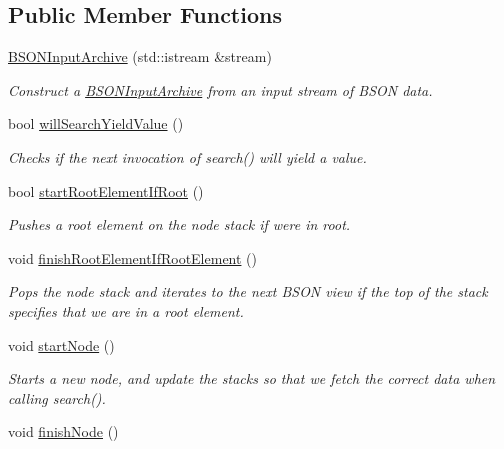 \subsection*{Public Member Functions}
\begin{DoxyCompactItemize}
\item 
\hyperlink{classboson_1_1BSONInputArchive_aa3f7a7e7c4b99945e67b80b982afa377}{B\+S\+O\+N\+Input\+Archive} (std\+::istream \&stream)
\begin{DoxyCompactList}\small\item\em Construct a \hyperlink{classboson_1_1BSONInputArchive}{B\+S\+O\+N\+Input\+Archive} from an input stream of B\+S\+ON data. \end{DoxyCompactList}\item 
bool \hyperlink{classboson_1_1BSONInputArchive_aad5d865ad41f3f27f3225e145ad2de82}{will\+Search\+Yield\+Value} ()
\begin{DoxyCompactList}\small\item\em Checks if the next invocation of search() will yield a value. \end{DoxyCompactList}\item 
bool \hyperlink{classboson_1_1BSONInputArchive_abc3cee7831d0e59dcd436c38b1e8b38d}{start\+Root\+Element\+If\+Root} ()
\begin{DoxyCompactList}\small\item\em Pushes a root element on the node stack if we\textquotesingle{}re in root. \end{DoxyCompactList}\item 
void \hyperlink{classboson_1_1BSONInputArchive_a1cd61c2cd2ef61545b8016beacd0ae16}{finish\+Root\+Element\+If\+Root\+Element} ()\hypertarget{classboson_1_1BSONInputArchive_a1cd61c2cd2ef61545b8016beacd0ae16}{}\label{classboson_1_1BSONInputArchive_a1cd61c2cd2ef61545b8016beacd0ae16}

\begin{DoxyCompactList}\small\item\em Pops the node stack and iterates to the next B\+S\+ON view if the top of the stack specifies that we are in a root element. \end{DoxyCompactList}\item 
void \hyperlink{classboson_1_1BSONInputArchive_acbf9509753c091e7352de7ee8aa3f8ff}{start\+Node} ()\hypertarget{classboson_1_1BSONInputArchive_acbf9509753c091e7352de7ee8aa3f8ff}{}\label{classboson_1_1BSONInputArchive_acbf9509753c091e7352de7ee8aa3f8ff}

\begin{DoxyCompactList}\small\item\em Starts a new node, and update the stacks so that we fetch the correct data when calling search(). \end{DoxyCompactList}\item 
void \hyperlink{classboson_1_1BSONInputArchive_ad8c8d5686977ae6030407334078321ec}{finish\+Node} ()\hypertarget{classboson_1_1BSONInputArchive_ad8c8d5686977ae6030407334078321ec}{}\label{classboson_1_1BSONInputArchive_ad8c8d5686977ae6030407334078321ec}


\end{DoxyCompactItemize}

